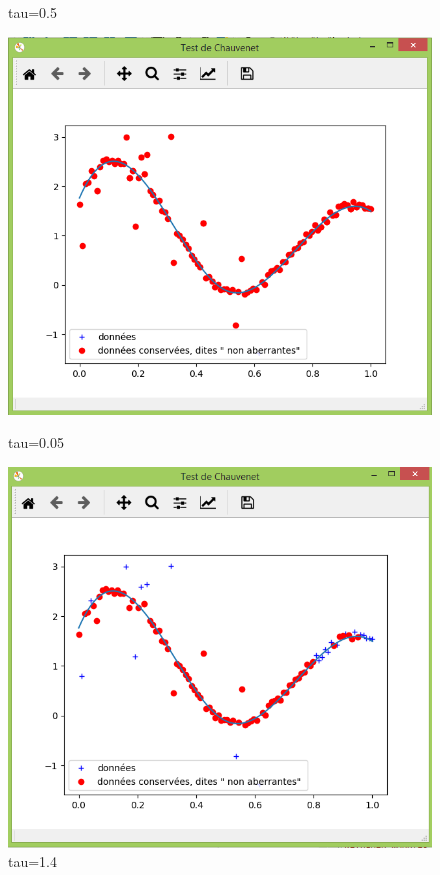 \documentclass[11pt]{report}
\begin{document}
\begin{figure}[!htb]
\caption{tau=0.5} %
\label{coeff_05qua} %
\endminipage
{}%
\includegraphics[width=\linewidth]{chauvm.PNG}  
\caption{tau=0.05}
\label{coeff_005qua}
\endminipage
{}%
\includegraphics[width=\linewidth]{chauvp.PNG}  
\caption{tau=1.4}
\label{coeff_1.4qua}

\endminipage

\end{figure} 
\end{document}
